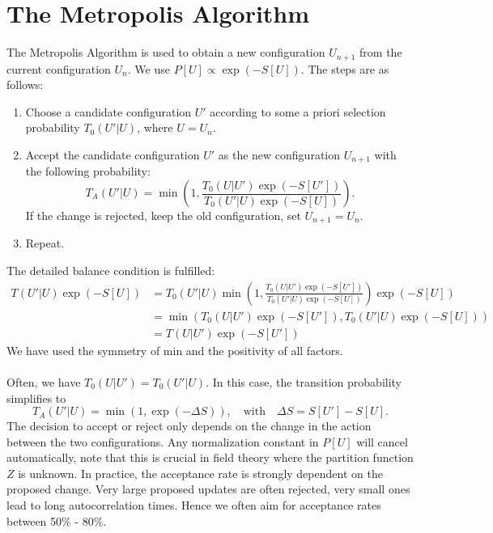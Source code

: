 \section{The Metropolis Algorithm}
The Metropolis Algorithm is used to obtain a new configuration $U_{n+1}$ from the current configuration $U_n$. We use $P[U] \propto \exp \left( -S[U]\right)$. The steps are as follows: 
\begin{enumerate}
    \item Choose a candidate configuration $U'$ according to some a priori selection probability $T_0(U'|U)$, where $U = U_n$. 
    \item Accept the candidate configuration $U'$ as the new configuration $U_{n+1}$ with the following probability: 
    \begin{equation}
        T_A(U'|U) = \min \left( 1, \frac{T_0(U|U') \exp( - S[U'])}{T_0(U'|U)\exp (-S[U])}\right). 
    \end{equation}
    If the change is rejected, keep the old configuration, set $U_{n+1} = U_n$. 
    \item Repeat. 
\end{enumerate}
The detailed balance condition is fulfilled: 
\begin{align}
    T(U'|U) \exp(-S[U]) &= T_0(U'|U) \min \left( 1, \frac{T_0(U|U') \exp( - S[U'])}{T_0(U'|U)\exp (-S[U])}\right) \exp (-S[U]) 
    \\ &= \min \left( T_0(U|U') \exp( - S[U']), T_0(U'|U)\exp (-S[U]) \right) \\ &= T(U|U') \exp(-S[U'])
\end{align}
We have used the symmetry of min and the positivity of all factors. \\\\
Often, we have $T_0(U|U') = T_0(U'|U)$. In this case, the transition probability simplifies to
\begin{equation}
    T_A(U'|U) = \min \left( 1, \exp (-\Delta S) \right), \quad \text{with} \quad \Delta S = S[U'] - S[U].
\end{equation}
The decision to accept or reject only depends on the change in the action between the two configurations. Any normalization constant in $P[U]$ will cancel automatically, note that this is crucial in field theory where the partition function $Z$ is unknown. 
In practice, the acceptance rate is strongly dependent on the proposed change. Very large proposed updates are often rejected, very small ones lead to long autocorrelation times. Hence we often aim for acceptance rates between 50\% - 80\%. 
